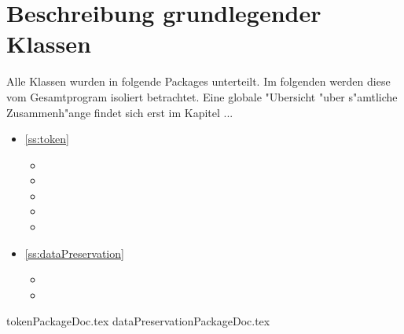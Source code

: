 \section{Beschreibung grundlegender Klassen}
Alle Klassen wurden in folgende Packages unterteilt. Im folgenden werden diese vom Gesamtprogram isoliert betrachtet. Eine globale "Ubersicht "uber s"amtliche Zusammenh"ange findet sich erst im Kapitel ...
\begin{itemize}
	\item \ref{ss:token} 
	\begin{itemize}
		\item {}
		\item {}
		\item {}
		\item {}
		\item {}
	\end{itemize}
	\item \ref{ss:dataPreservation} 
	\begin{itemize}
		\item {}
		\item {}
	\end{itemize}
\end{itemize}
{tokenPackageDoc.tex}
\newpage
{dataPreservationPackageDoc.tex}